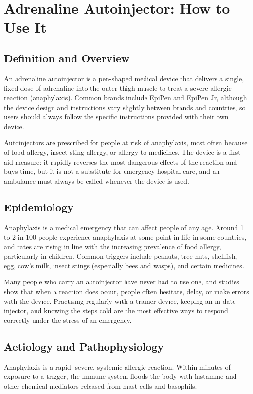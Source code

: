 \chapter{Adrenaline Autoinjector: How to Use It}

\section*{Definition and Overview}
An adrenaline autoinjector is a pen-shaped medical device that delivers a single, fixed dose of adrenaline into the outer thigh muscle to treat a severe allergic reaction (anaphylaxis). Common brands include EpiPen and EpiPen Jr, although the device design and instructions vary slightly between brands and countries, so users should always follow the specific instructions provided with their own device.

Autoinjectors are prescribed for people at risk of anaphylaxis, most often because of food allergy, insect-sting allergy, or allergy to medicines. The device is a first-aid measure: it rapidly reverses the most dangerous effects of the reaction and buys time, but it is not a substitute for emergency hospital care, and an ambulance must always be called whenever the device is used.

\section*{Epidemiology}
Anaphylaxis is a medical emergency that can affect people of any age. Around 1 to 2 in 100 people experience anaphylaxis at some point in life in some countries, and rates are rising in line with the increasing prevalence of food allergy, particularly in children. Common triggers include peanuts, tree nuts, shellfish, egg, cow's milk, insect stings (especially bees and wasps), and certain medicines.

Many people who carry an autoinjector have never had to use one, and studies show that when a reaction does occur, people often hesitate, delay, or make errors with the device. Practising regularly with a trainer device, keeping an in-date injector, and knowing the steps cold are the most effective ways to respond correctly under the stress of an emergency.

\section*{Aetiology and Pathophysiology}
Anaphylaxis is a rapid, severe, systemic allergic reaction. Within minutes of exposure to a trigger, the immune system floods the body with histamine and other chemical mediators released from mast cells and basophils.

